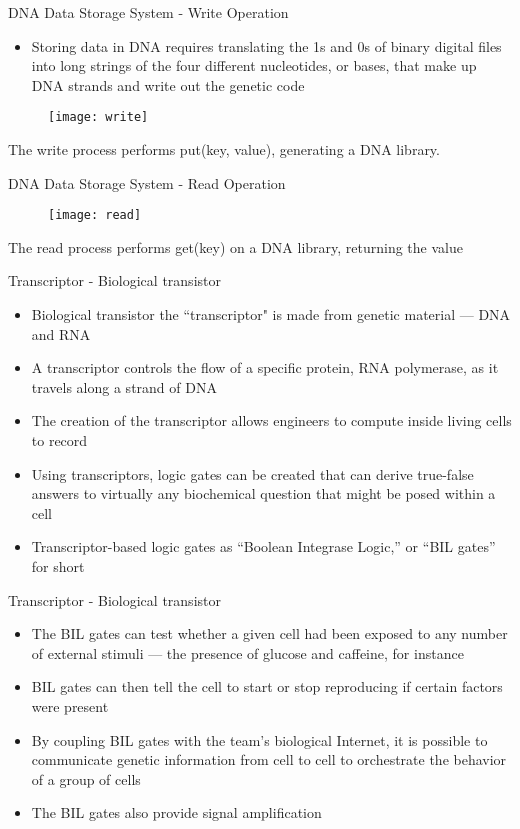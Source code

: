 \documentclass[10pt]{beamer}
\begin{document}
\begin{frame}[fragile]{DNA Data Storage System - Write Operation}
   \begin{itemize}
    \item Storing data in DNA requires translating the 1s and 0s of binary digital files into long strings of the four different nucleotides, or bases, that make up DNA strands and write out the genetic code
  \end{itemize}
  \begin{figure}
        \texttt{[image: write]} 
  \end{figure}
    The write process performs put(key, value), generating a DNA library.
\end{frame}

\begin{frame}[fragile]{DNA Data Storage System - Read Operation}
  \begin{figure}
        \texttt{[image: read]} 
  \end{figure}
   The read process performs get(key) on a DNA library, returning the value
\end{frame}

\begin{frame}[fragile]{Transcriptor - Biological transistor }
  \begin{itemize} 
  
  \item Biological transistor the “transcriptor" is made from genetic material — DNA and RNA 
  \item  A transcriptor controls the flow of a specific protein, RNA polymerase, as it travels along a strand of DNA
  \item The creation of the transcriptor allows engineers to compute inside living cells to record
  \item Using transcriptors, logic gates can be created that can derive true-false answers to virtually any biochemical question that might be posed within a cell
  \item Transcriptor-based logic gates as “Boolean Integrase Logic,” or “BIL gates” for short
  
  \end{itemize}
\end{frame}

\begin{frame}[fragile]{Transcriptor - Biological transistor }
  \begin{itemize} 
  \item The BIL gates can test whether a given cell had been exposed to any number of external stimuli — the presence of glucose and caffeine, for instance
  \item BIL gates can then tell the cell to start or stop reproducing if certain factors were present
  \item  By coupling BIL gates with the team’s biological Internet, it is possible to communicate genetic information from cell to cell to orchestrate the behavior of a group of cells
  \item The BIL gates also provide signal amplification
  \end{itemize}
\end{frame}
\end{document}
